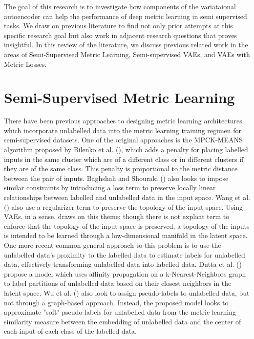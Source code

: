 \documentclass[./dissertation.tex]{subfiles}
\begin{document}

The goal of this research is to investigate how components of the variataional autoencoder can help the performance of deep metric learning in semi supervised tasks. We draw on previous literature to find not only prior attempts at this specific research goal but also work in adjacent research questions that proves insightful. In this review of the literature, we discuss previous related work in the areas of Semi-Supervised Metric Learning, Semi-supervised VAEs, and VAEs with Metric Losses. 


\section{Semi-Supervised Metric Learning}
There have been previous approaches to designing metric learning architectures which incorporate unlabelled data into the metric learning training regimen for semi-supervised datasets. One of the original approaches is the MPCK-MEANS algorithm proposed by Bilenko et al. (\citeyear{bilenko2004integrating}), which adds a penalty for placing labelled inputs in the same cluster which are of a different class or in different clusters if they are of the same class. This penalty is proportional to the metric distance between the pair of inputs. Baghshah and Shouraki (\citeyear{baghshah2009semi}) also looks to impose similar constraints by introducing a loss term to preserve locally linear relationships between labelled and unlabelled data in the input space. Wang et al. (\citeyear{wang2013semi}) also use a regularizer term to preserve the topology of the input space. Using VAEs, in a sense, draws on this theme: though there is not explicit term to enforce that the topology of the input space is preserved, a topology of the inputs is intended to be learned through a low-dimensional manifold in the latent space. \\

One more recent common general approach to this problem is to use the unlabelled data's proximity to the labelled data to estimate labels for unlabelled data, effectively transforming unlabelled data into labelled data. Dutta et al. (\citeyear{dutta2021semi}) propose a model which uses affinity propagation on a k-Nearest-Neighbors graph to label partitions of unlabelled data based on their closest neighbors in the latent space. Wu et al. (\citeyear{wu2020metric}) also look to assign pseudo-labels to unlabelled data, but not through a graph-based approach. Instead, the proposed model looks to approximate "soft" pseudo-labels for unlabelled data from the metric learning similarity measure between the embedding of unlabelled data and the center of each input of each class of the labelled data. \\
\end{document}
